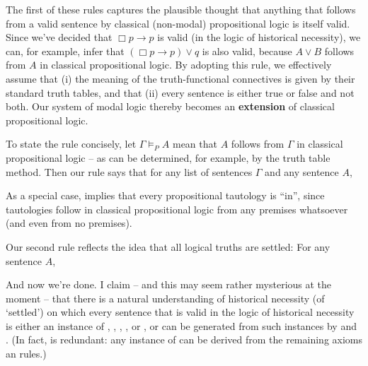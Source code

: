 The first of these rules captures the plausible thought that anything that
follows from a valid sentence by classical (non-modal) propositional logic is
itself valid. Since we've decided that $\Box p \to p$ is valid (in the logic of
historical necessity), we can, for example, infer that $(\Box p \to p) \lor q$
is also valid, because $A \lor B$ follows from $A$ in classical propositional
logic. By adopting this rule, we effectively assume that (i) the meaning of the
truth-functional connectives is given by their standard truth tables, and that
(ii) every sentence is either true or false and not both. Our system of modal
logic thereby becomes an \textbf{extension} of classical propositional
logic. \label{claim:extension}

To state the rule concisely, let $\Gamma \models_{P} A$ mean that $A$ follows
from $\Gamma$ in classical propositional logic -- as can be determined, for
example, by the truth table method. Then our rule says that for any list of
sentences $\Gamma$ and any sentence $A$,
%
\begin{principles}
\end{principles}

As a special case,  implies that every propositional tautology is
``in'', since tautologies follow in classical propositional logic from any
premises whatsoever (and even from no premises).

Our second rule reflects the idea that all logical truths are settled: For any
sentence $A$,
%
\begin{principles}
\end{principles}


And now we're done. I claim -- and this may seem rather mysterious at the moment
-- that there is a natural understanding of historical necessity (of `settled')
on which every sentence that is valid in the logic of historical necessity is
either an instance of , , , , or , or can be
generated from such instances by  and . (In fact,  is
redundant: any instance of  can be derived from the remaining axioms an
rules.)

